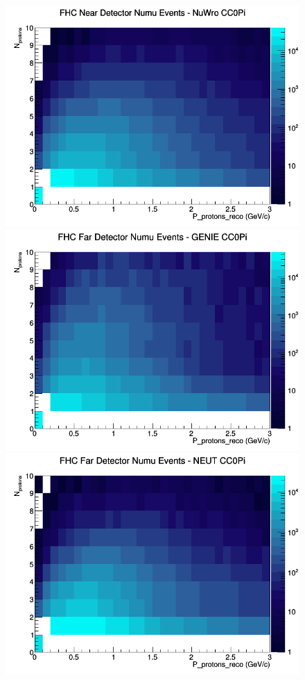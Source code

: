 \documentclass[12pt]{article}
\begin{document}
\begin{figure}[h]
\includegraphics[width=\linewidth]{eff_N_P/LAr/protons/CC0Pi_FHC_ND_numu_N_P_NuWro.png}
\endminipage
\newline
{}
\includegraphics[width=\linewidth]{eff_N_P/LAr/protons/CC0Pi_FHC_FD_numu_N_P_GENIE.png}
\endminipage
{}
\includegraphics[width=\linewidth]{eff_N_P/LAr/protons/CC0Pi_FHC_FD_numu_N_P_NEUT.png}

\end{figure}
\end{document}
